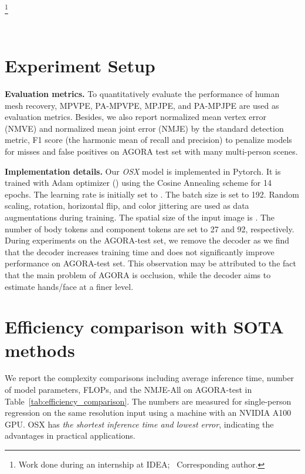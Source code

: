 \documentclass[10pt,twocolumn,letterpaper]{article}
\newcommand{\modelname}{\emph{OSX}\xspace}
\newcommand\blfootnote[1]{\begingroup
  \renewcommand\thefootnote{}\footnote{#1}\addtocounter{footnote}{-1}\endgroup
}
\begin{document}
\blfootnote{ Work done during an internship at IDEA; ~Corresponding author.}\

\section{Experiment Setup}
\label{sec:exp_setup}

\noindent\textbf{Evaluation metrics.} To quantitatively evaluate the performance of human mesh recovery, MPVPE, PA-MPVPE, MPJPE, and PA-MPJPE are used as evaluation metrics. Besides, we also report normalized mean vertex error (NMVE) and normalized mean joint error (NMJE) by the standard detection metric, F1 score (the harmonic mean of recall and precision) to penalize models for misses and false positives on AGORA test set with many multi-person scenes.

\noindent\textbf{Implementation details.} Our \modelname model is implemented in Pytorch. It is trained with Adam optimizer () using the Cosine Annealing scheme for 14 epochs. The learning rate is initially set to . The batch size is set to 192. Random scaling, rotation, horizontal flip, and color jittering are used as data augmentations during training. The spatial size of the input image is . The number of body tokens  and component tokens  are set to 27 and 92, respectively. During experiments on the AGORA-test set, we remove the decoder as we find that the decoder increases training time and does not significantly improve performance on AGORA-test set. This observation may be attributed to the fact that the main problem of AGORA is occlusion, while the decoder aims to estimate hands/face at a finer level.

\section{Efficiency comparison with SOTA methods}
\label{sec:efficiency_comp}
\noindent We report the complexity comparisons including average inference time, number of model parameters, FLOPs, and the NMJE-All on AGORA-test in Table~\ref{tab:efficiency_comparison}. The numbers are measured for single-person regression on the same resolution input using a machine with an NVIDIA A100 GPU. OSX has \emph{the shortest inference time and lowest error}, indicating the advantages in practical applications.
        
\end{document}
